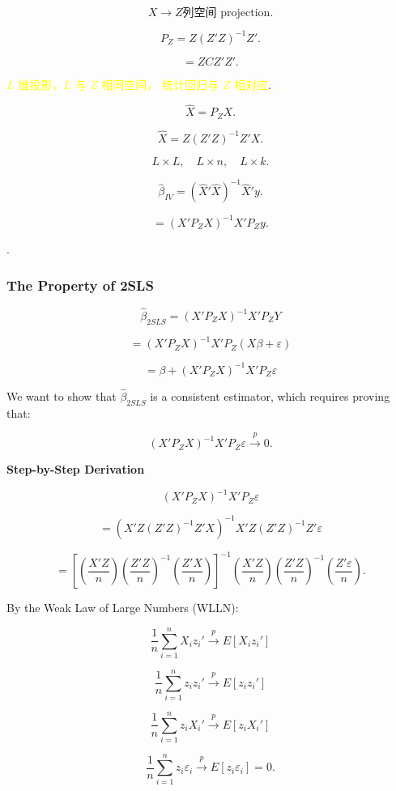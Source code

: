 \documentclass[12pt, oneside]{article}
\begin{document}
\[
X \to Z \text{列空间 projection}.
\]

\[
P_Z = Z (Z'Z)^{-1} Z'.
\]

\[
= Z C Z' Z'.
\]

\textcolor{yellow}{\( L \) 维投影，\( L \) 与 \( Z \) 相同空间， 统计回归与 \( Z \) 相对应}.
\textcolor{yellow}{.}

\[
\hat{X} = P_Z X.
\]

\[
\hat{X} = Z (Z'Z)^{-1} Z' X.
\]

\[
L \times L, \quad L \times n, \quad L \times k.
\]

\[
\hat{\beta}_{IV} = (\hat{X}' \hat{X})^{-1} \hat{X}' y.
\]

\[
= (X' P_Z X)^{-1} X' P_Z y.
\]

\textcolor{blue}{}.

\subsubsection{The Property of 2SLS}

\[
\hat{\beta}_{2SLS} = (X'P_Z X)^{-1} X'P_Z Y
\]

\[
= (X'P_Z X)^{-1} X'P_Z (X \beta + \varepsilon)
\]

\[
= \beta + (X'P_Z X)^{-1} X' P_Z \varepsilon
\]

We want to show that \( \hat{\beta}_{2SLS} \) is a consistent estimator, which requires proving that:

\[
(X'P_Z X)^{-1} X' P_Z \varepsilon \xrightarrow{p} 0.
\]

\textbf*{Step-by-Step Derivation}

\[
(X'P_Z X)^{-1} X' P_Z \varepsilon
\]

\[
= (X'Z (Z'Z)^{-1} Z'X)^{-1} X' Z (Z'Z)^{-1} Z' \varepsilon
\]

\[
= \left[ \left( \frac{X'Z}{n} \right) \left( \frac{Z'Z}{n} \right)^{-1} \left( \frac{Z'X}{n} \right) \right]^{-1} 
\left( \frac{X'Z}{n} \right) \left( \frac{Z'Z}{n} \right)^{-1} \left( \frac{Z' \varepsilon}{n} \right).
\]

By the Weak Law of Large Numbers (WLLN):

\[
\frac{1}{n} \sum_{i=1}^{n} X_i z_i' \xrightarrow{p} E[X_i z_i']
\]

\[
\frac{1}{n} \sum_{i=1}^{n} z_i z_i' \xrightarrow{p} E[z_i z_i']
\]

\[
\frac{1}{n} \sum_{i=1}^{n} z_i X_i' \xrightarrow{p} E[z_i X_i']
\]

\[
\frac{1}{n} \sum_{i=1}^{n} z_i \varepsilon_i \xrightarrow{p} E[z_i \varepsilon_i] = 0.
\]
\end{document}
